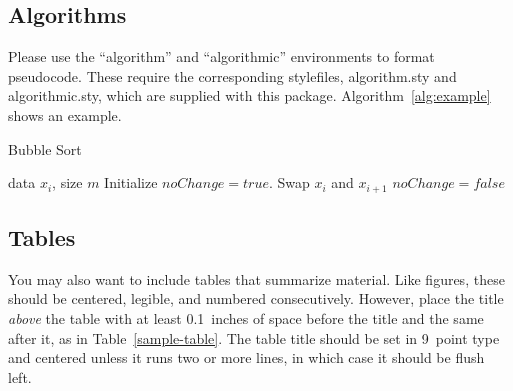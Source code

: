 \documentclass{article}
\begin{document}
\subsection{Algorithms}

Please use the ``algorithm'' and ``algorithmic''
environments to format pseudocode. These require
the corresponding stylefiles, algorithm.sty and
algorithmic.sty, which are supplied with this package.
Algorithm~\ref{alg:example} shows an example.

\begin{algorithm}[tb]
  \caption{Bubble Sort}
  \label{alg:example}
  \begin{algorithmic}
     data $x_i$, size $m$
    \REPEAT
    \STATE Initialize $noChange = true$.
    \STATE Swap $x_i$ and $x_{i+1}$
    \STATE $noChange = false$
    \ENDIF
    \ENDFOR
  \end{algorithmic}
\end{algorithm}

\subsection{Tables}

You may also want to include tables that summarize material. Like
figures, these should be centered, legible, and numbered consecutively.
However, place the title \emph{above} the table with at least
0.1~inches of space before the title and the same after it, as in
Table~\ref{sample-table}. The table title should be set in 9~point
type and centered unless it runs two or more lines, in which case it
should be flush left.

\end{document}
